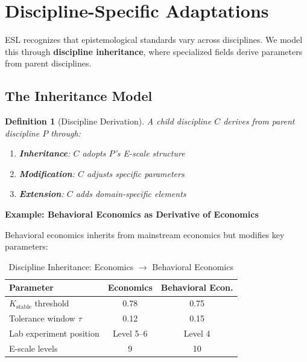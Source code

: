 \documentclass[11pt,a4paper]{article}
\newtheorem{definition}{Definition}
\begin{document}
\section{Discipline-Specific Adaptations}

ESL recognizes that epistemological standards vary across disciplines.
We model this through \textbf{discipline inheritance}, where specialized
fields derive parameters from parent disciplines.

\subsection{The Inheritance Model}

\begin{definition}[Discipline Derivation]
A child discipline $C$ derives from parent discipline $P$ through:
\begin{enumerate}
    \item \textbf{Inheritance}: $C$ adopts $P$'s E-scale structure
    \item \textbf{Modification}: $C$ adjusts specific parameters
    \item \textbf{Extension}: $C$ adds domain-specific elements
\end{enumerate}
\end{definition}

\textbf{Example: Behavioral Economics as Derivative of Economics}

Behavioral economics inherits from mainstream economics but modifies
key parameters:

\begin{table}[h]
\centering
\caption{Discipline Inheritance: Economics $\to$ Behavioral Economics}
\label{tab:inheritance}
\begin{tabular}{lcc}
\toprule
\textbf{Parameter} & \textbf{Economics} & \textbf{Behavioral Econ.} \\
\midrule
$K_{\text{stable}}$ threshold & 0.78 & 0.75 \\
Tolerance window $\tau$ & 0.12 & 0.15 \\
Lab experiment position & Level 5--6 & Level 4 \\
E-scale levels & 9 & 10 \\
\bottomrule
\end{tabular}
\end{table}
\end{document}
